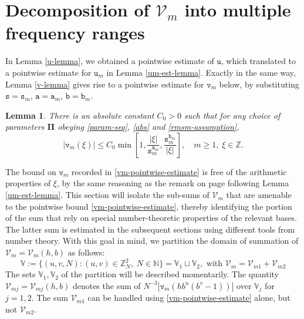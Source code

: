 \documentclass[12pt, twoside]{article}
\newtheorem{lemma}[theorem]{Lemma}
\theoremstyle{definition}
\numberwithin{equation}{section}
\begin{document}
\section{Decomposition of $\mathcal{V}_m$ into multiple frequency ranges} \label{estimating-vm-section}
In Lemma \ref{u-lemma}, we obtained a pointwise estimate of $\mathtt u$, which translated to a pointwise estimate for $\mathtt u_m$ in Lemma \ref{um-est-lemma}. Exactly in the same way, Lemma \ref{v-lemma} gives rise to a pointwise estimate for $\mathtt v_m$ below, by substituting $\mathtt s= \mathtt s_m$, $\mathtt a = \mathtt a_m$, $\mathtt b = \mathtt b_m$.  
\begin{lemma} \label{vm-est-lemma}
There is an absolute constant $C_0 > 0$ such that for any choice of parameters $\pmb{\Pi}$ obeying \ref{param-seq}, 
\eqref{abs} and \eqref{rmsm-assumption}, 
\begin{equation} \label{vm-pointwise-estimate} 
\bigl| \mathtt v_m(\xi) \bigr| \leq C_0 \min \left[1, \frac{|\xi|}{\mathtt s_m^{\mathtt a_m}}, \frac{\mathtt s_m^{\mathtt b_m}}{|\xi|}\right], \quad m \geq 1, \; \xi \in \mathbb Z.   
\end{equation}  
\end{lemma} 
\noindent The bound on $\mathtt v_m$ recorded in \eqref{vm-pointwise-estimate} is free of the arithmetic properties of $\xi$, by the same reasoning as the remark on page \pageref{uniform-bound-remark} following Lemma \ref{um-est-lemma}. This section will isolate the sub-sums of $\mathcal{V}_{m}$ that are amenable to the pointwise bound \eqref{vm-pointwise-estimate}, thereby identifying the portion of the sum that rely on special number-theoretic properties of the relevant bases. The latter sum is estimated in the subsequent sections using different tools from number theory. With this goal in mind, we partition the domain of summation of $\mathcal V_m = \mathcal V_m(h, b)$ as follows: 
\begin{equation} \label{Vm-decomposition} 
\mathbb V := \bigl\{(u, v, N) : (u, v) \in \mathbb Z_N^2, \; N \in \mathbb N \bigr\} = \mathbb V_1 \sqcup \mathbb V_2, \text{ with } \mathcal V_m = \mathcal V_{m1} + \mathcal V_{m2} 
\end{equation}  
The sets $\mathbb V_1, \mathbb V_2$ of the partition will be described momentarily. The quantity $\mathcal V_{mj} = \mathcal V_{mj}(h, b)$ denotes the sum of $N^{-3} |\mathtt v_m(h b^u(b^v-1))|$ over $\mathbb V_j$ for $j = 1, 2$. The sum $\mathcal V_{m1}$ can be handled using \eqref{vm-pointwise-estimate} alone, but not $\mathcal V_{m2}$. 
\end{document}
